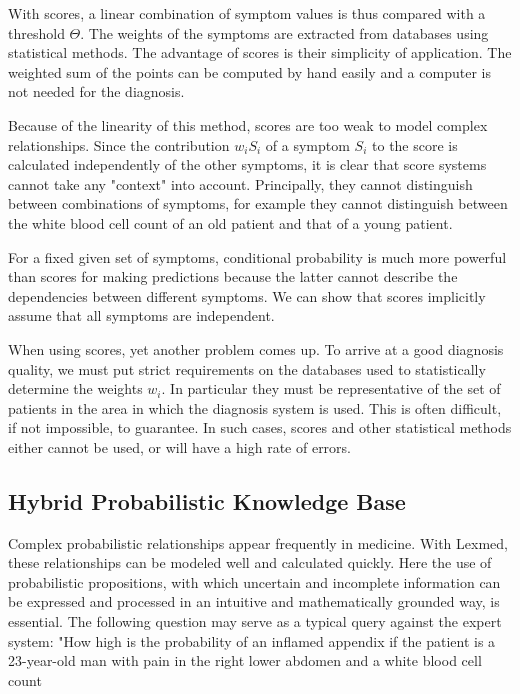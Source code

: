 \documentclass[10pt]{book}
\begin{document}
With scores, a linear combination of symptom values is thus compared with a threshold $\Theta$. The weights of the symptoms are extracted from databases using statistical methods. The advantage of scores is their simplicity of application. The weighted sum of the points can be computed by hand easily and a computer is not needed for the diagnosis.

Because of the linearity of this method, scores are too weak to model complex relationships. Since the contribution $w_{i} S_{i}$ of a symptom $S_{i}$ to the score is calculated independently of the other symptoms, it is clear that score systems cannot take any "context" into account. Principally, they cannot distinguish between combinations of symptoms, for example they cannot distinguish between the white blood cell count of an old patient and that of a young patient.

For a fixed given set of symptoms, conditional probability is much more powerful than scores for making predictions because the latter cannot describe the dependencies between different symptoms. We can show that scores implicitly assume that all symptoms are independent.

When using scores, yet another problem comes up. To arrive at a good diagnosis quality, we must put strict requirements on the databases used to statistically determine the weights $w_{i}$. In particular they must be representative of the set of patients in the area in which the diagnosis system is used. This is often difficult, if not impossible, to guarantee. In such cases, scores and other statistical methods either cannot be used, or will have a high rate of errors.

\subsection{Hybrid Probabilistic Knowledge Base}
Complex probabilistic relationships appear frequently in medicine. With Lexmed, these relationships can be modeled well and calculated quickly. Here the use of probabilistic propositions, with which uncertain and incomplete information can be expressed and processed in an intuitive and mathematically grounded way, is essential. The following question may serve as a typical query against the expert system: "How high is the probability of an inflamed appendix if the patient is a 23-year-old man with pain in the right lower abdomen and a white blood cell count
\end{document}
